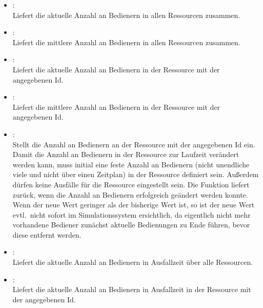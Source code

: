 \begin{itemize}

\item
{}:\\
Liefert die aktuelle Anzahl an Bedienern in allen Ressourcen zusammen.

\item
{}:\\
Liefert die mittlere Anzahl an Bedienern in allen Ressourcen zusammen.
  
\item
{}:\\
Liefert die aktuelle Anzahl an Bedienern in der Ressource mit der angegebenen Id.
  
\item
{}:\\
Liefert die mittlere Anzahl an Bedienern in der Ressource mit der angegebenen Id.
  
\item
{}:\\
Stellt die Anzahl an Bedienern an der Ressource mit der angegebenen Id ein.
Damit die Anzahl an Bedienern in der Ressource zur Laufzeit verändert werden kann,
muss initial eine feste Anzahl an Bedienern (nicht unendliche viele und nicht über einen Zeitplan)
in der Ressource definiert sein. Außerdem dürfen keine Ausfälle für die Ressource eingestellt sein.
Die Funktion liefert  zurück, wenn die Anzahl an Bedienern erfolgreich geändert
werden konnte. Wenn der neue Wert geringer als der bisherige Wert ist, so ist der neue Wert
evtl.\ nicht sofort im Simulationssystem ersichtlich, da eigentlich nicht mehr vorhandene Bediener
zunächst aktuelle Bedienungen zu Ende führen, bevor diese entfernt werden.

\item
{}:\\
Liefert die aktuelle Anzahl an Bedienern in Ausfallzeit über alle Ressourcen.

\item
{}:\\
Liefert die aktuelle Anzahl an Bedienern in Ausfallzeit in der Ressource mit der angegebenen Id.

\end{itemize}

